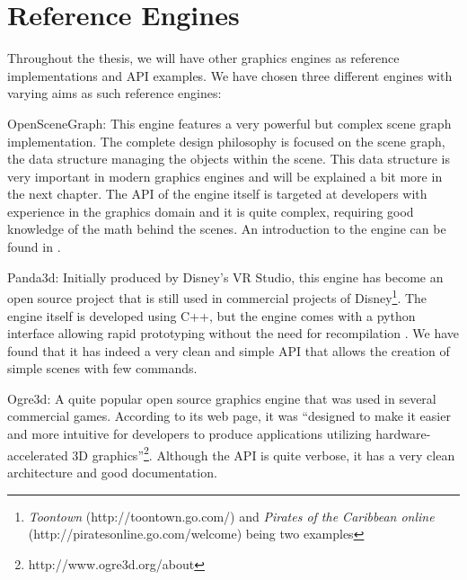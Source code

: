 \section{Reference Engines}

	Throughout the thesis, we will have other graphics engines as reference implementations and API examples. We have chosen three different engines with varying aims as such reference engines:

	\begin{smalllist}
		\item OpenSceneGraph: This engine features a very powerful but complex scene graph implementation. The complete design philosophy is focused on the scene graph, the data structure managing the objects within the scene. This data structure is very important in modern graphics engines and will be explained a bit more in the next chapter. The API of the engine itself is targeted at developers with experience in the graphics domain and it is quite complex, requiring good knowledge of the math behind the scenes. An introduction to the engine can be found in \cite{OpenSceneGraph22}.
		\item Panda3d: Initially produced by Disney’s VR Studio, this engine has become an open source project that is still used in commercial projects of Disney\footnote{\emph{Toontown} (http://toontown.go.com/) and \emph{Pirates of the Caribbean online} (http://piratesonline.go.com/welcome) being two examples}. The engine itself is developed using C++, but the engine comes with a python interface allowing rapid prototyping without the need for recompilation \cite{Goslin:2004:PGE:1032275.1032359}. We have found that it has indeed a very clean and simple API that allows the creation of simple scenes with few commands.
		\item Ogre3d: A quite popular open source graphics engine that was used in several commercial games. According to its web page, it was ``designed to make it easier and more intuitive for developers to produce applications utilizing hardware-accelerated 3D graphics''\footnote{http://www.ogre3d.org/about}. Although the API is quite verbose, it has a very clean architecture and good documentation.
	\end{smalllist}

